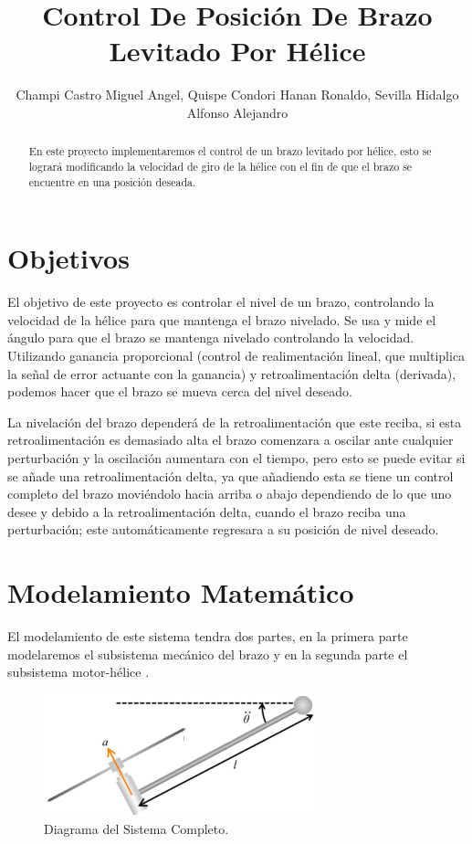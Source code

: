 \documentclass[a4paper]{IEEEtran} %
\begin{document}
\title{Control De Posición De Brazo Levitado Por Hélice}
\author{Champi Castro Miguel Angel, Quispe Condori Hanan Ronaldo, Sevilla Hidalgo Alfonso Alejandro}
\maketitle
\begin{abstract}
En este proyecto implementaremos el control de un brazo levitado por hélice, esto se logrará modificando la velocidad de giro de la hélice con el fin de que el brazo se encuentre en una posición deseada.
\end{abstract}
\section{Objetivos}
El objetivo de este proyecto es controlar el nivel de un brazo, controlando la velocidad de la hélice para que mantenga el brazo nivelado. Se usa y mide el ángulo para que el brazo se mantenga nivelado controlando la velocidad. Utilizando ganancia proporcional (control de realimentación lineal, que multiplica la señal de error actuante con la ganancia) y retroalimentación delta (derivada), podemos hacer que el brazo se mueva cerca del nivel deseado.

La nivelación del brazo dependerá de la retroalimentación que este reciba, si esta retroalimentación es demasiado alta el brazo comenzara a oscilar ante cualquier perturbación y la oscilación aumentara con el tiempo, pero esto se puede evitar si se añade una retroalimentación delta, ya que añadiendo esta se tiene un control completo del brazo moviéndolo hacia arriba o abajo dependiendo de lo que uno desee y debido a la retroalimentación delta, cuando el brazo reciba una perturbación; este automáticamente regresara a su posición de nivel deseado.

\section{Modelamiento Matemático}
\label{sec:modelamiento}
El modelamiento de este sistema tendra dos partes, en la primera parte modelaremos el subsistema mecánico del brazo y en la segunda parte el subsistema motor-hélice \cite{gunel2016modeling}.
\begin{figure}[h]
    \centering
        \includegraphics[width=8cm]{images/1}
        \caption{Diagrama del Sistema Completo.}
        \label{fig:DLC}
\end{figure}
\end{document}
